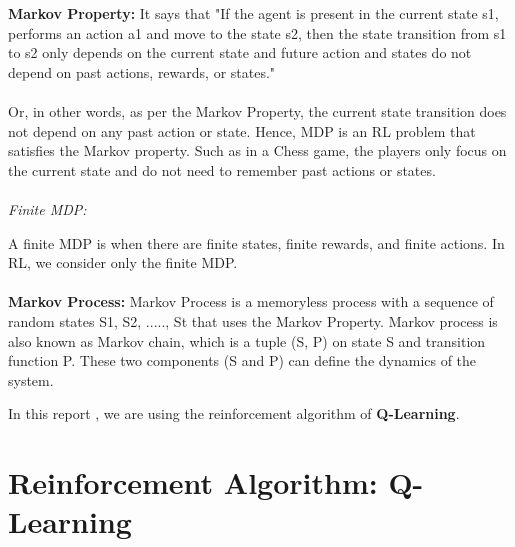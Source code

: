 \documentclass[12pt,a4paper]{report}
\begin{document}
\textbf{Markov Property:}
It says that "If the agent is present in the current state s1, performs an action a1 and move to the state s2, then the state transition from s1 to s2 only depends on the current state and future action and states do not depend on past actions, rewards, or states."
\\ \\
Or, in other words, as per the Markov Property, the current state transition does not depend on any past action or state. Hence, MDP is an RL problem that satisfies the Markov property. Such as in a Chess game, the players only focus on the current state and do not need to remember past actions or states.
\\ \\
\textit{Finite MDP:}

A finite MDP is when there are finite states, finite rewards, and finite actions. In RL, we consider only the finite MDP.
\\ \\
\textbf{Markov Process:}
Markov Process is a memoryless process with a sequence of random states S1, S2, ....., St that uses the Markov Property. Markov process is also known as Markov chain, which is a tuple (S, P) on state S and transition function P. These two components (S and P) can define the dynamics of the system.

In this report , we are using the reinforcement algorithm of \textbf{Q-Learning}.

\section{Reinforcement Algorithm: Q-Learning}
\end{document}
